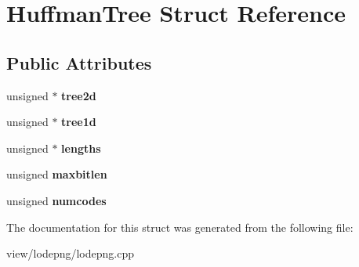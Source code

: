 \hypertarget{struct_huffman_tree}{\section{Huffman\-Tree Struct Reference}
\label{struct_huffman_tree}
}
\subsection*{Public Attributes}
\begin{DoxyCompactItemize}
\item 
\hypertarget{struct_huffman_tree_a91160304cb771d2f9f39ee357c9b05a8}{unsigned $\ast$ {\bfseries tree2d}}\label{struct_huffman_tree_a91160304cb771d2f9f39ee357c9b05a8}

\item 
\hypertarget{struct_huffman_tree_a47b3346a25fe0a3222b595c236ad146e}{unsigned $\ast$ {\bfseries tree1d}}\label{struct_huffman_tree_a47b3346a25fe0a3222b595c236ad146e}

\item 
\hypertarget{struct_huffman_tree_aef81d45a5c56276c5699a8e9a575021d}{unsigned $\ast$ {\bfseries lengths}}\label{struct_huffman_tree_aef81d45a5c56276c5699a8e9a575021d}

\item 
\hypertarget{struct_huffman_tree_adf034ca9ce62a4ebfffaaeaba4378a26}{unsigned {\bfseries maxbitlen}}\label{struct_huffman_tree_adf034ca9ce62a4ebfffaaeaba4378a26}

\item 
\hypertarget{struct_huffman_tree_a608df5a24f60d1077a5cde19d5149e1f}{unsigned {\bfseries numcodes}}\label{struct_huffman_tree_a608df5a24f60d1077a5cde19d5149e1f}

\end{DoxyCompactItemize}


The documentation for this struct was generated from the following file\-:\begin{DoxyCompactItemize}
\item 
view/lodepng/lodepng.\-cpp\end{DoxyCompactItemize}
